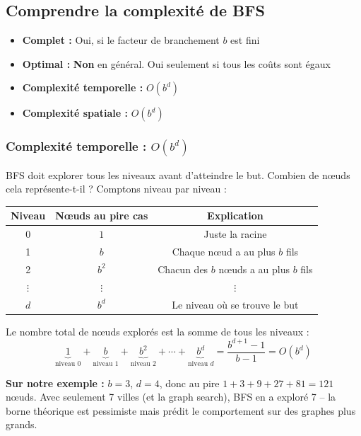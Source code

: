 \documentclass[11pt,a4paper]{article}
\begin{document}
\subsection{Comprendre la complexité de BFS}

\begin{theorembox}
\begin{itemize}
    \item \textbf{Complet :} Oui, si le facteur de branchement $b$ est fini
    \item \textbf{Optimal :} \textbf{Non} en général. Oui seulement si tous les coûts sont égaux
    \item \textbf{Complexité temporelle :} $O(b^d)$
    \item \textbf{Complexité spatiale :} $O(b^d)$
\end{itemize}
\end{theorembox}

\subsubsection*{Complexité temporelle : $O(b^d)$}

BFS doit explorer tous les niveaux avant d'atteindre le but. Combien de nœuds cela représente-t-il ? Comptons niveau par niveau :

\begin{center}
\begin{tabular}{ccc}
\toprule
\textbf{Niveau} & \textbf{Nœuds au pire cas} & \textbf{Explication} \\
\midrule
0 & $1$ & Juste la racine \\
1 & $b$ & Chaque nœud a au plus $b$ fils \\
2 & $b^2$ & Chacun des $b$ nœuds a au plus $b$ fils \\
$\vdots$ & $\vdots$ & $\vdots$ \\
$d$ & $b^d$ & Le niveau où se trouve le but \\
\bottomrule
\end{tabular}
\end{center}

Le nombre total de nœuds explorés est la somme de tous les niveaux :
$$\underbrace{1}_{\text{niveau 0}} + \underbrace{b}_{\text{niveau 1}} + \underbrace{b^2}_{\text{niveau 2}} + \cdots + \underbrace{b^d}_{\text{niveau } d} = \frac{b^{d+1} - 1}{b - 1} = O(b^d)$$

\textbf{Sur notre exemple :} $b = 3$, $d = 4$, donc au pire $1 + 3 + 9 + 27 + 81 = 121$ nœuds. Avec seulement 7 villes (et la graph search), BFS en a exploré 7 -- la borne théorique est pessimiste mais prédit le comportement sur des graphes plus grands.
\end{document}
